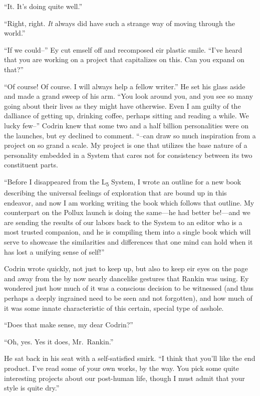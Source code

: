 ``It. It's doing quite well.''

``Right, right. \emph{It} always did have such a strange way of moving through the world.''

``If we could--'' Ey cut emself off and recomposed eir plastic smile. ``I've heard that you are working on a project that capitalizes on this. Can you expand on that?''

``Of course! Of course. I will always help a fellow writer.'' He set his glass aside and made a grand sweep of his arm. ``You look around you, and you see so many going about their lives as they might have otherwise. Even I am guilty of the dalliance of getting up, drinking coffee, perhaps sitting and reading a while. We lucky few--'' Codrin knew that some two and a half billion personalities were on the launches, but ey declined to comment. ``--can draw so much inspiration from a project on so grand a scale. My project is one that utilizes the base nature of a personality embedded in a System that cares not for consistency between its two constituent parts.

``Before I disappeared from the L\textsubscript{5} System, I wrote an outline for a new book describing the universal feelings of exploration that are bound up in this endeavor, and now I am working writing the book which follows that outline. My counterpart on the Pollux launch is doing the same---he had better be!---and we are sending the results of our labors back to the System to an editor who is a most trusted companion, and he is compiling them into a single book which will serve to showcase the similarities and differences that one mind can hold when it has lost a unifying sense of self!''

Codrin wrote quickly, not just to keep up, but also to keep eir eyes on the page and away from the by now nearly dancelike gestures that Rankin was using. Ey wondered just how much of it was a conscious decision to be witnessed (and thus perhaps a deeply ingrained need to be seen and not forgotten), and how much of it was some innate characteristic of this certain, special type of asshole.

``Does that make sense, my dear Codrin?''

``Oh, yes. Yes it does, Mr.~Rankin.''

He sat back in his seat with a self-satisfied smirk. ``I think that you'll like the end product. I've read some of your own works, by the way. You pick some quite interesting projects about our post-human life, though I must admit that your style is quite dry.''

